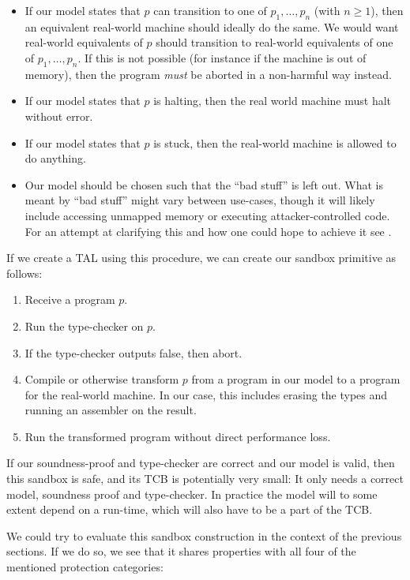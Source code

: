 \begin{itemize}
\item If our model states that $p$ can transition to one of $p_1, \dots, p_n$
  (with $n \geq 1$), then an equivalent real-world machine should ideally do the
  same. We would want real-world equivalents of $p$ should transition to
  real-world equivalents of one of $p_1, \dots, p_n$. If this is not possible
  (for instance if the machine is out of memory), then the program \emph{must}
  be aborted in a non-harmful way instead.
\item If our model states that $p$ is halting, then the real world machine
  must halt without error.
\item If our model states that $p$ is stuck, then the real-world machine is
  allowed to do anything.
\item Our model should be chosen such that the ``bad stuff'' is left out. What
  is meant by ``bad stuff'' might vary between use-cases, though it will likely
  include accessing unmapped memory or executing attacker-controlled code. For
  an attempt at clarifying this and how one could hope to achieve it see
  .
\end{itemize}

If we create a TAL using this procedure, we can create our sandbox primitive as
follows:

\begin{enumerate}
\item Receive a program $p$.
\item Run the type-checker on $p$.
\item If the type-checker outputs false, then abort.
\item Compile or otherwise transform $p$ from a program in our model to a
  program for the real-world machine. In our case, this includes erasing the
  types and running an assembler on the result.
\item Run the transformed program without direct performance loss.
\end{enumerate}

If our soundness-proof and type-checker are correct and our model is valid, then
this sandbox is safe, and its TCB is potentially very small: It only needs a
correct model, soundness proof and type-checker. In practice the model will to
some extent depend on a run-time, which will also have to be a part of the TCB.

We could try to evaluate this sandbox construction in the context of the
previous sections. If we do so, we see that it shares properties with all four
of the mentioned protection categories:

